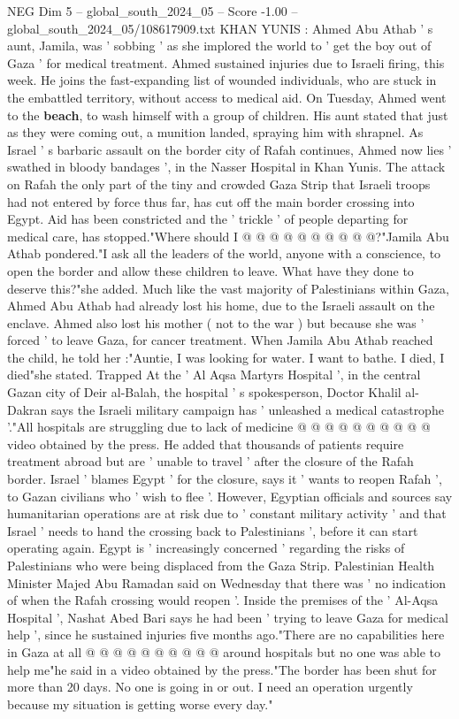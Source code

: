 \begin{textsample}{NEG Dim 5 – global\_south\_2024\_05 – Score -1.00 – global\_south\_2024\_05/108617909.txt}  \label{ex:f5_neg_383}
KHAN YUNIS : Ahmed Abu Athab ' s aunt, Jamila, was ' sobbing ' as she implored the world to ' get the boy out of Gaza ' for medical treatment.
Ahmed sustained injuries due to Israeli firing, this week.
He joins the fast-expanding list of wounded individuals, who are stuck in the embattled territory, without access to medical aid.
On Tuesday, Ahmed went to the \textbf{beach}, to wash himself with a group of children.
His aunt stated that just as they were coming out, a munition landed, spraying him with shrapnel.
As Israel ' s barbaric assault on the border city of Rafah continues, Ahmed now lies ' swathed in bloody bandages ', in the Nasser Hospital in Khan Yunis.
The attack on Rafah the only part of the tiny and crowded Gaza Strip that Israeli troops had not entered by force thus far, has cut off the main border crossing into Egypt.
Aid has been constricted and the ' trickle ' of people departing for medical care, has stopped."Where should I @ @ @ @ @ @ @ @ @ @?"Jamila Abu Athab pondered."I ask all the leaders of the world, anyone with a conscience, to open the border and allow these children to leave.
What have they done to deserve this?"she added.
Much like the vast majority of Palestinians within Gaza, Ahmed Abu Athab had already lost his home, due to the Israeli assault on the enclave.
Ahmed also lost his mother ( not to the war ) but because she was ' forced ' to leave Gaza, for cancer treatment.
When Jamila Abu Athab reached the child, he told her :"Auntie, I was looking for water.
I want to bathe.
I died, I died"she stated.
Trapped At the ' Al Aqsa Martyrs Hospital ', in the central Gazan city of Deir al-Balah, the hospital ' s spokesperson, Doctor Khalil al-Dakran says the Israeli military campaign has ' unleashed a medical catastrophe '."All hospitals are struggling due to lack of medicine @ @ @ @ @ @ @ @ @ @ video obtained by the press.
He added that thousands of patients require treatment abroad but are ' unable to travel ' after the closure of the Rafah border.
Israel ' blames Egypt ' for the closure, says it ' wants to reopen Rafah ', to Gazan civilians who ' wish to flee '.
However, Egyptian officials and sources say humanitarian operations are at risk due to ' constant military activity ' and that Israel ' needs to hand the crossing back to Palestinians ', before it can start operating again.
Egypt is ' increasingly concerned ' regarding the risks of Palestinians who were being displaced from the Gaza Strip.
Palestinian Health Minister Majed Abu Ramadan said on Wednesday that there was ' no indication of when the Rafah crossing would reopen '.
Inside the premises of the ' Al-Aqsa Hospital ', Nashat Abed Bari says he had been ' trying to leave Gaza for medical help ', since he sustained injuries five months ago."There are no capabilities here in Gaza at all @ @ @ @ @ @ @ @ @ @ around hospitals but no one was able to help me"he said in a video obtained by the press."The border has been shut for more than 20 days.
No one is going in or out.
I need an operation urgently because my situation is getting worse every day."

\end{textsample}
